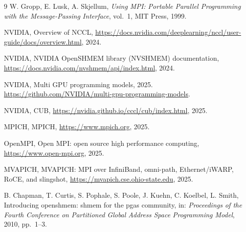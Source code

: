 \begin{chapterbibliography}{9}
  W. Gropp, E. Lusk, A. Skjellum, \emph{Using MPI: Portable Parallel Programming
  with the Message-Passing Interface}, vol.~1, MIT Press, 1999.

  NVIDIA, Overview of NCCL, \url{https://docs.nvidia.com/deeplearning/nccl/user-guide/docs/overview.html},
  2024.

  NVIDIA, NVIDIA OpenSHMEM library (NVSHMEM) documentation,
  \url{https://docs.nvidia.com/nvshmem/api/index.html}, 2024.

  NVIDIA, Multi GPU programming models, 2025.\newline
  \url{https://github.com/NVIDIA/multi-gpu-programming-models}.

  NVIDIA, CUB, \url{https://nvidia.github.io/cccl/cub/index.html}, 2025.

  MPICH, MPICH, \url{https://www.mpich.org}, 2025.

  OpenMPI, Open MPI: open source high performance computing,
  \url{https://www.open-mpi.org}, 2025.

  MVAPICH, MVAPICH: MPI over InfiniBand, omni-path, Ethernet/iWARP, RoCE, and
  slingshot, \url{https://mvapich.cse.ohio-state.edu}, 2025.

  B. Chapman, T. Curtis, S. Pophale, S. Poole, J. Kuehn, C. Koelbel, L. Smith,
  Introducing openshmem: shmem for the pgas community, in: \emph{Proceedings of
  the Fourth Conference on Partitioned Global Address Space Programming Model},
  2010, pp.~1--3.
\end{chapterbibliography}

